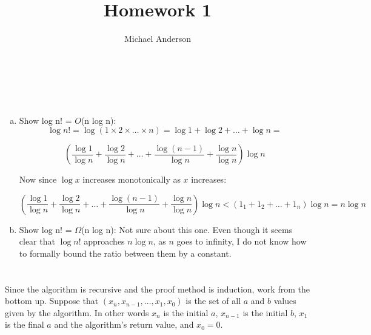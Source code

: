 \documentclass{article}
\author{Michael Anderson}
\title{Homework 1}
\begin{document}
\maketitle
{}
\\
\flushleft
\newpage

\section{}
\begin{enumerate}[a)]
\item{Show log n! = $O$(n log n):}
\[
\log n! = \log(1 \times 2 \times \ldots \times n) = \log 1 + \log 2 + \ldots +
 \log n = 
\]

\[
(\frac{\log 1}{\log n} + \frac{\log 2}{\log n} + \ldots +
 \frac{\log (n - 1)}{\log n} + \frac{\log n}{\log n})\log n
\]

Now since $\log x$ increases monotonically as $x$ increases:

\[
(\frac{\log 1}{\log n} + \frac{\log 2}{\log n} + \ldots +
 \frac{\log (n - 1)}{\log n} + \frac{\log n}{\log n} ) \log n <
 (1_1 + 1_2 + \ldots + 1_n) \log n = n \log n
\]


\item{Show log n! = $\Omega$(n log n):}
Not sure about this one. Even though it seems clear that $\log n!$ approaches
$n \log n$, as $n$ goes to infinity, I do not know how to formally bound the
ratio
between them by a constant.

\end{enumerate}

\section{}
Since the algorithm is recursive and the proof method is induction, work from
the bottom up. Suppose that $(x_n,x_{n-1}, \ldots ,x_1,x_0)$ is the set of
all $a$ and $b$ values given by the algorithm. In other words $x_n$ is the
initial $a$, $x_{n-1}$ is the initial $b$, $x_1$ is the final $a$ and the
algorithm's return value, and $x_0 = 0$.
\end{document}
